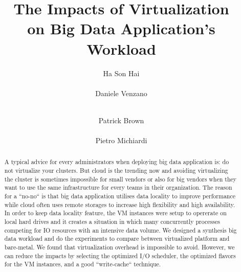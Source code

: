 \documentclass{acmsig}
\begin{document}
\title{The Impacts of Virtualization\\ on Big Data Application's Workload}


\author{
\alignauthor
Ha Son Hai\\
       \\
\alignauthor
Daniele Venzano\\
       \\
\and
\alignauthor
Patrick Brown\\
       \\
\alignauthor
Pietro Michiardi
       \\
}

\maketitle


\begin{abstract}
A typical advice for every administrators when deploying big data application is: do not virtualize your clusters. But cloud is the trending now and avoiding virtualizing the cluster is sometimes impossible for small vendors or also for big vendors when they want to use the same infrastructure for every teams in their organization. The reason for a ``no-no`` is that big data application utilises data locality to improve performance while cloud often uses remote storages to increase high flexibility and high availability. In order to keep data locality feature, the VM instances were setup to opererate on local hard drives and it creates a situation in which many concurrently processes competing for IO resources with an intensive data volume. We designed a synthesis big data workload and do the experiments to compare between virtualized platform and bare-metal. We found that virtualization overhead is impossible to avoid. However, we can reduce the impacts by selecting the optimized I/O scheduler, the optimized flavors for the VM instances, and a good ``write-cache`` technique.

\end{abstract}
\end{document}

